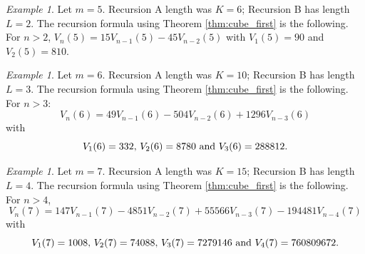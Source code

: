 \documentclass[11pt,reqno]{amsart}
\theoremstyle{remark}
\newtheorem{example}[theorem]{Example}
\begin{document}
\begin{example}
Let $m=5$.
\noindent
Recursion A length was $K=6$; Recursion B has length $L=2$.
The recursion formula using
Theorem \ref{thm:cube_first} is the following. For $n>2$,
\noindent$V_n(5) = 15 V_{n-1}(5) -  45 V_{n-2}(5)$
with $V_{1}(5) = 90$ and $V_{2}(5) = 810$.
\end{example}

\begin{example}
  Let $m=6$.
\noindent
Recursion A length was $K=10$; \quad Recursion B has length $L=3$.
The recursion formula using
Theorem \ref{thm:cube_first} is the following. For $n>3$:
$$
V_n(6) = 49 V_{n-1}(6) - 504 V_{n-2}(6) + 1296 V_{n-3}(6)
$$
with
$$
\textrm{\rm $V_{1}(6) = 332$, $V_{2}(6) = 8780$ and $V_{3}(6) = 288812$.}
$$
\end{example}


\begin{example}
  Let $m=7$.
\noindent
Recursion A length was $K=15$; \quad Recursion B has length $L=4$.
The recursion formula using
Theorem \ref{thm:cube_first} is the following. For $n>4$,
$$
V_{n}(7) = 147 V_{n-1}(7) - 4851 V_{n-2}(7) + 55566V_{n-3}(7) - 194481V_{n-4}(7)
$$
with
$$
\textrm{\rm $V_{1}(7)= 1008$, $V_{2}(7) = 74088$, $V_{3}(7) = 7279146$ and $V_{4}(7) = 760809672$.}
$$
\end{example}
\end{document}
